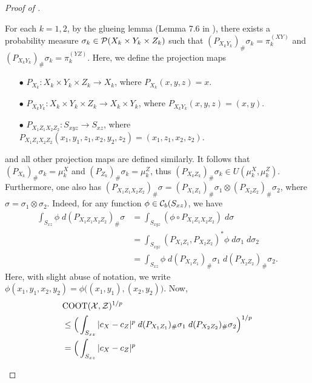 \begin{proof}[Proof of ]
\begin{enumerate}
    For each $k = 1,2$, by the glueing lemma (Lemma 7.6 in \citep{Villani03}), there exists a probability measure
    $\sigma_k \in \mathcal P(X_k \times Y_k \times Z_k)$ such that
    $(P_{X_k Y_k})_{\#} \sigma_k = \pi^{(XY)}_k$ and
    $(P_{X_k Y_k})_{\#} \sigma_k = \pi^{(YZ)}_k$. Here, we define the projection maps
    \begin{itemize}
      \item[$\bullet$] $P_{X_k}: X_k \times Y_k \times Z_k \to X_k$, where
      $P_{X_k}(x,y,z) = x$.
      \item[$\bullet$] $P_{X_k Y_k}: X_k \times Y_k \times Z_k \to X_k \times Y_k$,
      where $P_{X_k Y_k}(x,y,z) = (x,y)$.
      \item[$\bullet$] $P_{X_1 Z_1 X_2 Z_2}: S_{xyz} \to S_{xz}$, where
      $P_{X_1 Z_1 X_2 Z_2}(x_1,y_1,z_1, x_2, y_2, z_2) = (x_1,z_1, x_2, z_2)$.
    \end{itemize}
    and all other projection maps are defined similarly. It follows that
    $(P_{X_k})_{\#} \sigma_k = \mu_k^X$ and $(P_{Z_k})_{\#} \sigma_k = \mu_k^Z$, thus
    $(P_{X_k Z_k})_{\#} \sigma_k \in U(\mu_k^X, \mu_k^Z)$. Furthermore, one also has
    $(P_{X_1 Z_1 X_2 Z_2})_{\#} \sigma =
    (P_{X_1 Z_1})_{\#} \sigma_1 \otimes (P_{X_2 Z_2})_{\#} \sigma_2$,
    where $\sigma = \sigma_1 \otimes \sigma_2$. Indeed, for any function $\phi \in \mathcal C_b(S_{xz})$, we have
    \begin{equation}
      \begin{split}
        \int_{S_{xz}} \phi \; d(P_{X_1 Z_1 X_2 Z_2})_{\#} \sigma
        &= \int_{S_{xyz}} (\phi \circ P_{X_1 Z_1 X_2 Z_2}) \; d\sigma \\
        &= \int_{S_{xyz}} (P_{X_1 Z_1}, P_{X_2 Z_2})^*\phi
        \; d \sigma_1 \; d \sigma_2 \\
        &= \int_{S_{xz}} \phi \; d (P_{X_1 Z_1})_{\#} \sigma_1 \;
        d (P_{X_2 Z_2})_{\#} \sigma_2.
      \end{split}
    \end{equation}
    Here, with slight abuse of notation, we write $\phi(x_1,y_1, x_2,y_2) = \phi\big( (x_1,y_1), (x_2,y_2) \big)$. Now,
    \begin{equation}
      \begin{split}
        &\coot(\cX, \cZ)^{1/p} \\
        &\leq \Big( \int_{S_{xz}} \vert c_X - c_Z \vert^p
        \; d (P_{X_1 Z_1})_{\#} \sigma_1 \; d (P_{X_2 Z_2})_{\#} \sigma_2 \Big)^{1/p} \\
        &= \Big( \int_{S_{xz}} \vert c_X - c_Z \vert^p

\end{split}
\end{equation}
\end{enumerate}
\end{proof}
